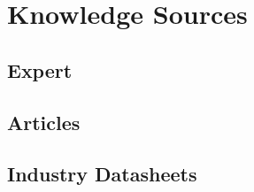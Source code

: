 \section{Knowledge Sources}

\subsection{Expert}

\subsection{Articles}

\subsection{Industry Datasheets}